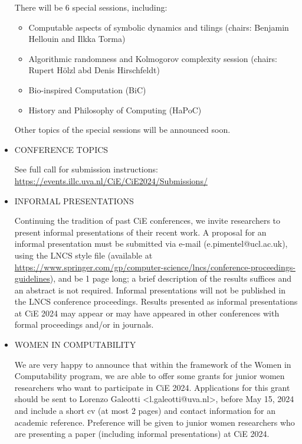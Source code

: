 \documentclass[prodmode,acmtecs]{acmsmall} %
\begin{document}
\begin{itemize}
  There will be 6 special sessions, including: 
 
\begin{itemize}\item  Computable aspects of symbolic dynamics and tilings (chairs: Benjamin Hellouin and Ilkka Torma)
\item  Algorithmic randomness and Kolmogorov complexity session (chairs: Rupert Hölzl abd Denis Hirschfeldt)
\item  Bio-inspired Computation (BiC)
\item  History and Philosophy of Computing (HaPoC)
\end{itemize} 
  Other topics of the special sessions will be announced soon. 
 
\item  CONFERENCE TOPICS 
 
  See full call for submission instructions: \href{https://events.illc.uva.nl/CiE/CiE2024/Submissions/}{https://events.illc.uva.nl/CiE/CiE2024/Submissions/} 
 
\item  INFORMAL PRESENTATIONS 
 
  Continuing the tradition of past CiE conferences, we invite researchers to present informal presentations of their recent work. A proposal for an informal presentation must be submitted via e-mail (e.pimentel@ucl.ac.uk), using the LNCS style file (available at \href{https://www.springer.com/gp/computer-science/lncs/conference-proceedings-guidelines}{https://www.springer.com/gp/computer-science/lncs/conference-proceedings-guidelines}), and be 1 page long; a brief description of the results suffices and an abstract is not required. Informal presentations will not be published in the LNCS conference proceedings. Results presented as informal presentations at CiE 2024 may appear or may have appeared in other conferences with formal proceedings and/or in journals. 
 
\item  WOMEN IN COMPUTABILITY 
 
  We are very happy to announce that within the framework of the Women in Computability program, we are able to offer some grants for junior women researchers who want to participate in CiE 2024. Applications for this grant should be sent to Lorenzo Galeotti <l.galeotti@uva.nl>, before May 15, 2024 and include a short cv (at most 2 pages) and contact information for an academic reference. Preference will be given to junior women researchers who are presenting a paper (including informal presentations) at CiE 2024. 
 

\end{itemize}
\end{document}
